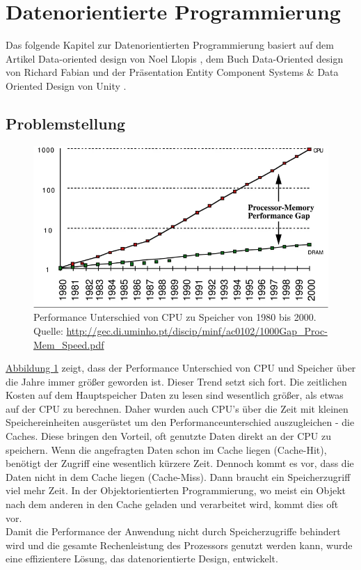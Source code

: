 \section{Datenorientierte Programmierung}
Das folgende Kapitel zur Datenorientierten Programmierung basiert auf dem Artikel \glqq Data-oriented design\grqq{} von Noel Llopis \cite{Data-OrientedDesign}, dem Buch \glqq Data-Oriented design\grqq{} von Richard Fabian \cite{DOD} und der Präsentation \glqq Entity Component Systems \& Data Oriented Design\grqq{} von Unity \cite{ECS-DOD}.
\subsection{Problemstellung}
\begin{figure}[H]
\begin{center}
\includegraphics[scale=0.5]{Bilder/gap.png}
\caption[Performance Unterschied CPU - Speicher]{Performance Unterschied von CPU zu Speicher von 1980 bis 2000.\\
\footnotesize{Quelle: \url{http://gec.di.uminho.pt/discip/minf/ac0102/1000Gap_Proc-Mem_Speed.pdf}}}
\label{fig:gap}
\end{center}
\end{figure}
\hyperref[fig:gap]{Abbildung \ref{fig:gap}} zeigt, dass der Performance Unterschied von CPU und Speicher über die Jahre immer größer geworden ist. Dieser Trend setzt sich fort. Die zeitlichen Kosten auf dem Hauptspeicher Daten zu lesen sind wesentlich größer, als etwas auf der CPU zu berechnen. Daher wurden auch CPU's über die Zeit mit kleinen Speichereinheiten ausgerüstet um den Performanceunterschied auszugleichen - die Caches. Diese bringen den Vorteil, oft genutzte Daten direkt an der CPU zu speichern. Wenn die angefragten Daten schon im Cache liegen (Cache-Hit), benötigt der Zugriff eine wesentlich kürzere Zeit. Dennoch kommt es vor, dass die Daten nicht in dem Cache liegen (Cache-Miss). Dann braucht ein Speicherzugriff viel mehr Zeit. In der Objektorientierten Programmierung, wo meist ein Objekt nach dem anderen in den Cache geladen und verarbeitet wird, kommt dies oft vor.\\
Damit die Performance der Anwendung nicht durch Speicherzugriffe behindert wird und die gesamte Rechenleistung des Prozessors genutzt werden kann, wurde eine effizientere Lösung, das datenorientierte Design, entwickelt.
\newpage
